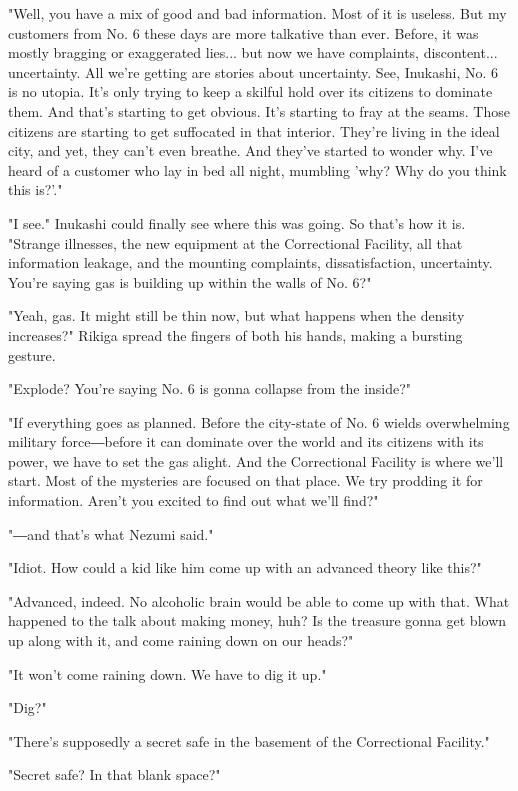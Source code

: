 "Well, you have a mix of good and bad information. Most of it is
useless. But my customers from No. 6 these days are more talkative than
ever. Before, it was mostly bragging or exaggerated lies... but now we
have complaints, discontent... uncertainty. All we're getting are
stories about uncertainty. See, Inukashi, No. 6 is no utopia. It's only
trying to keep a skilful hold over its citizens to dominate them. And
that's starting to get obvious. It's starting to fray at the seams.
Those citizens are starting to get suffocated in that interior. They're
living in the ideal city, and yet, they can't even breathe. And they've
started to wonder why. I've heard of a customer who lay in bed all
night, mumbling 'why? Why do you think this is?'."

"I see." Inukashi could finally see where this was going. So that's how
it is. "Strange illnesses, the new equipment at the Correctional
Facility, all that information leakage, and the mounting complaints,
dissatisfaction, uncertainty. You're saying gas is building up within
the walls of No. 6?"

"Yeah, gas. It might still be thin now, but what happens when the
density increases?" Rikiga spread the fingers of both his hands, making
a bursting gesture.

"Explode? You're saying No. 6 is gonna collapse from the inside?"

"If everything goes as planned. Before the city-state of No. 6 wields
overwhelming military force―before it can dominate over the world and
its citizens with its power, we have to set the gas alight. And the
Correctional Facility is where we'll start. Most of the mysteries are
focused on that place. We try prodding it for information. Aren't you
excited to find out what we'll find?"

"―and that's what Nezumi said."

"Idiot. How could a kid like him come up with an advanced theory like
this?"

"Advanced, indeed. No alcoholic brain would be able to come up with
that. What happened to the talk about making money, huh? Is the treasure
gonna get blown up along with it, and come raining down on our heads?"

"It won't come raining down. We have to dig it up."

"Dig?"

"There's supposedly a secret safe in the basement of the Correctional
Facility."

"Secret safe? In that blank space?"

